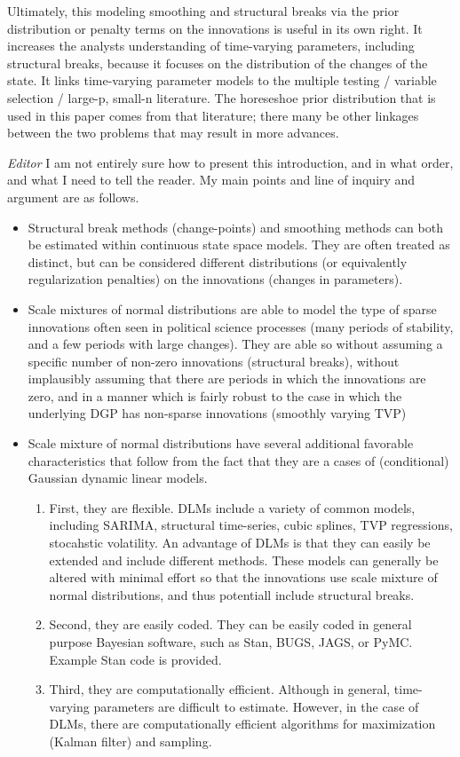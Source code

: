 \documentclass{article}
\begin{document}
Ultimately, this modeling smoothing and structural breaks via the prior distribution or penalty terms on the innovations is useful in its own right. 
It increases the analysts understanding of time-varying parameters, including structural breaks, because it focuses on the distribution of the changes of the state.
It links time-varying parameter models to the multiple testing / variable selection / large-p, small-n literature.
The horeseshoe prior distribution that is used in this paper comes from that literature; there many be other linkages between the two problems that may result in more advances.

\textit{Editor} I am not entirely sure how to present this introduction, and in what order, and what I need to tell the reader. My main points and line of inquiry and argument are as follows.

\begin{itemize}
\item Structural break methods (change-points) and smoothing methods can both be estimated within continuous state space models. 
They are often treated as distinct, but can be considered different distributions (or equivalently regularization penalties) on the innovations (changes in parameters).
\item Scale mixtures of normal distributions are able to model the type of sparse innovations often seen in political science processes (many periods of stability, and a few periods with large changes).
They are able so without assuming a specific number of non-zero innovations (structural breaks), without implausibly assuming that there are periods in which the innovations are zero, and in a manner which is fairly robust to the case in which the underlying DGP has non-sparse innovations (smoothly varying TVP)
\item Scale mixture of normal distributions have several additional favorable characteristics that follow from the fact that they are a cases of (conditional) Gaussian dynamic linear models.
  \begin{enumerate}
  \item First, they are flexible.
    DLMs include a variety of common models, including SARIMA, structural time-series, cubic splines, TVP regressions, stocahstic volatility. 
    An advantage of DLMs is that they can easily be extended and include different methods. 
    These models can generally be altered with minimal effort so that the innovations use scale mixture of normal distributions, and thus potentiall include structural breaks.
  \item Second, they are easily coded.
    They can be easily coded in general purpose Bayesian software, such as Stan, BUGS, JAGS, or PyMC.
    Example Stan code is provided.
  \item Third, they are computationally efficient.
    Although in general, time-varying parameters are difficult to estimate.
    However, in the case of DLMs, there are computationally efficient algorithms for maximization (Kalman filter) and sampling.
  \end{enumerate}
\end{itemize}
\end{document}
